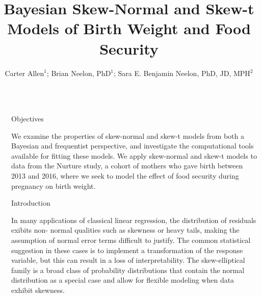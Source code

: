 \documentclass[final]{beamer}
\title{Bayesian Skew-Normal and Skew-t Models of Birth Weight and Food Security} %
\author{Carter Allen$^1$; Brian Neelon, PhD$^1$; Sara E. Benjamin Neelon, PhD, JD, MPH$^2$} %
\institute{$^1$Department of Public Health Sciences, Medical University of South Carolina; $^2$Bloomberg School of Public Health, Johns Hopkins University}
\newlength{\sepwid}
\newlength{\onecolwid}
\begin{document}

\setlength{\belowcaptionskip}{2ex} %
\setlength\belowdisplayshortskip{2ex} %

\begin{frame}[t] %

\begin{columns}[t] %

\begin{column}{\sepwid}\end{column} %

\begin{column}{\onecolwid} %


\begin{alertblock}{Objectives}
 
We examine the properties of skew-normal and skew-t models from both a Bayesian and frequentist perspective, and investigate the computational tools available for fitting these models. We apply skew-normal and skew-t models to data from the Nurture study, a cohort of mothers who gave birth between 2013 and 2016, where we seek to model the effect of food security during pregnancy on birth weight.

\end{alertblock}


\begin{block}{Introduction}

In many applications of classical linear regression, the distribution of residuals exibits non- normal qualities such as skewness or heavy tails, making the assumption of normal error terms difficult to justify. The common statistical suggestion in these cases is to implement a transformation of the response variable, but this can result in a loss of interpretability. The skew-elliptical family is a broad class of probability distributions that contain the normal distribution as a special case and allow for flexible modeling when data exhibit skewness.


\end{block}
\end{column}
\end{columns}
\end{frame}
\end{document}
